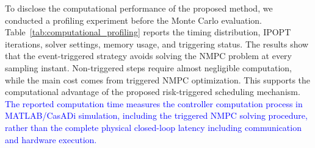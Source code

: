 \documentclass[lettersize,journal]{IEEEtran}
\begin{document}
To disclose the computational performance of the proposed method, we conducted a profiling experiment before the Monte Carlo evaluation. Table~\ref{tab:computational_profiling} reports the timing distribution, IPOPT iterations, solver settings, memory usage, and triggering status. The results show that the event-triggered strategy avoids solving the NMPC problem at every sampling instant. Non-triggered steps require almost negligible computation, while the main cost comes from triggered NMPC optimization. This supports the computational advantage of the proposed risk-triggered scheduling mechanism. \textcolor{blue}{The reported computation time measures the controller computation process in MATLAB/CasADi simulation, including the triggered NMPC solving procedure, rather than the complete physical closed-loop latency including communication and hardware execution.}
\end{document}
